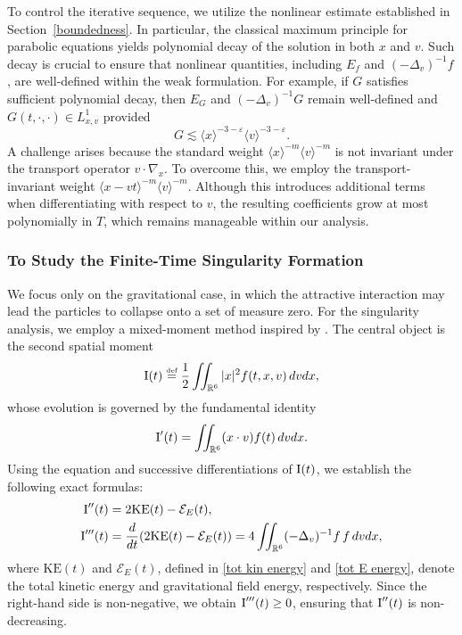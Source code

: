 \documentclass[reqno,11pt,final]{amsart}
\theoremstyle{plain}
\numberwithin{equation}{section}
\numberwithin{theorem}{section}
\newcommand{\eqdef }{\overset{\mbox{\tiny{def}}}{=}}
\begin{document}
To control the iterative sequence, we utilize the nonlinear estimate established in Section~\ref{boundedness}. In particular, the classical maximum principle for parabolic equations yields polynomial decay of the solution in both $x$ and $v$. Such decay is crucial to ensure that nonlinear quantities, including $E_f$ and $(-\Delta_v)^{-1}f$, are well-defined within the weak formulation. For example, if $G$ satisfies sufficient polynomial decay, then $E_G$ and $(-\Delta_v)^{-1}G$ remain well-defined and $G(t,\cdot,\cdot)\in L^1_{x,v}$ provided
$$
G \lesssim \langle x\rangle^{-3-\varepsilon}\langle v\rangle^{-3-\varepsilon}.
$$
A challenge arises because the standard weight $\langle x\rangle^{-m}\langle v\rangle^{-m}$ is not invariant under the transport operator $v\cdot\nabla_x$. To overcome this, we employ the transport-invariant weight $\langle x-vt\rangle^{-m}\langle v\rangle^{-m}$. Although this introduces additional terms when differentiating with respect to $v$, the resulting coefficients grow at most polynomially in $T$, which remains manageable within our analysis.


\subsubsection{To Study the Finite-Time Singularity Formation}
We focus only on the gravitational case, in which the attractive interaction may lead the particles to collapse onto a set of measure zero. For the singularity analysis, we employ a mixed-moment method inspired by
\cite{VP_Horst_1982, VMV_Bobylev_1997, VR_Choi_2024}. The central object is the
second spatial moment
$$
\textup{I}(t) \eqdef \frac12 \iint_{\mathbb{R}^6} |x|^2 f(t,x,v)\,dvdx,
$$
whose evolution is governed by the fundamental identity
$$
\textup{I}'(t) = \iint_{\mathbb{R}^6} (x\cdot v) f(t)\,dvdx.
$$
Using the equation and successive differentiations of $\textup{I}(t)$, we establish the
following exact formulas:
\begin{align*}
    \textup{I}''(t) &= 2\mathrm{KE}(t)- \mathcal{E}_E(t),\\
\textup{I}'''(t) &= \frac{d}{dt}(2\mathrm{KE}(t) - \mathcal{E}_E(t))
= 4\iint_{\mathbb{R}^6} (-\Delta_v)^{-1}f\, f\,dvdx,
\end{align*}
where $\mathrm{KE}(t)$ and $\mathcal{E}_E(t)$, defined in \eqref{tot kin energy} and \eqref{tot E energy}, denote the total kinetic energy and gravitational field energy, respectively. Since the right-hand side
is non-negative, we obtain $\textup{I}'''(t)\ge 0$, ensuring that $\textup{I}''(t)$ is
non-decreasing.
\end{document}
